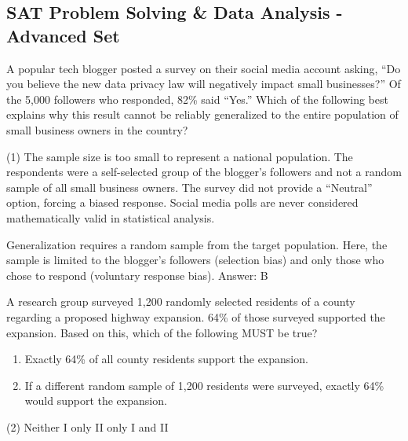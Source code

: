 \documentclass[11pt,paper=a4,answers]{exam}
\begin{document}
\begin{questions}
\pointsinrightmargin
\pointsdroppedatright
\marksnotpoints
{}
\pointformat{\boldmath\themarginpoints}
\bracketedpoints


\section*{SAT Problem Solving \& Data Analysis - Advanced Set}

\question
A popular tech blogger posted a survey on their social media account asking, ``Do you believe the new data privacy law will negatively impact small businesses?'' Of the 5,000 followers who responded, 82\% said ``Yes.'' Which of the following best explains why this result cannot be reliably generalized to the entire population of small business owners in the country?
\begin{tasks}(1)
    \task The sample size is too small to represent a national population.
    \task The respondents were a self-selected group of the blogger's followers and not a random sample of all small business owners.
    \task The survey did not provide a ``Neutral'' option, forcing a biased response.
    \task Social media polls are never considered mathematically valid in statistical analysis.
\end{tasks}

\begin{solution}
Generalization requires a random sample from the target population. Here, the sample is limited to the blogger's followers (selection bias) and only those who chose to respond (voluntary response bias). 
\vspace{5pt}
Answer: \colorbox{yellow!100}{B}
\end{solution}

\vspace{1cm}

\question
A research group surveyed 1,200 randomly selected residents of a county regarding a proposed highway expansion. 64\% of those surveyed supported the expansion. Based on this, which of the following MUST be true?
\begin{enumerate}
    \item Exactly 64\% of all county residents support the expansion.
    \item If a different random sample of 1,200 residents were surveyed, exactly 64\% would support the expansion.
\end{enumerate}
\begin{tasks}(2)
    \task Neither \task I only \task II only \task I and II
\end{tasks}


\end{questions}
\end{document}
